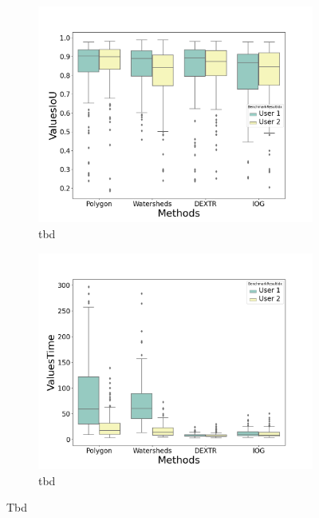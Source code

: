 \begin{figure} [h!]
 	\centering
 	\begin{subfigure}[t]{0.49\textwidth}
 		\centering
 		\includegraphics[width=\textwidth]{figures/chap53_afe_cmo_iou.png}
 		\caption{
 			tbd
 		} \label{fig:ch5:sec3:cmo_afe_iou}
 	\end{subfigure}
 	\hfill
 	\begin{subfigure}[t]{0.49\textwidth}
 		\centering
 		\includegraphics[width=\textwidth]{figures/chap53_afe_cmo_time.png}
 		\caption{
 			tbd
 		}\label{fig:ch5:sec3:cmo_afe_time}
 	\end{subfigure}
 	\caption[IoU Sample Transformation]{		
 		Tbd
 	}\label{fig:ch5:sec3:cmo_afe}
\end{figure}

